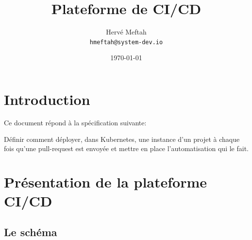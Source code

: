 \documentclass{article}
\title{Plateforme de CI/CD} %
\author{Hervé Meftah\\ \texttt{hmeftah@system-dev.io}} %
\date{\today} %
\begin{document}
\maketitle %


\section*{Introduction} %

Ce document répond à la spécification suivante:

\begin{info}
	Définir comment déployer, dans Kubernetes, une instance d’un projet à chaque fois qu’une pull-request est envoyée et
	mettre en place l’automatisation qui le fait.
\end{info}





\section{Présentation de la plateforme CI/CD } %


\subsection{Le schéma}
\end{document}
